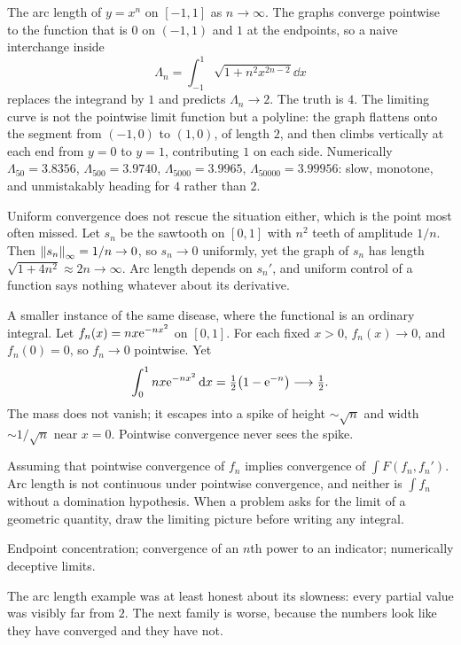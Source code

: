 \begin{worked}
The arc length of $y=x^{n}$ on $[-1,1]$ as $n\to\infty$. The graphs converge pointwise to the function that is $0$ on $(-1,1)$ and $1$ at the endpoints, so a naive interchange inside
\[\Lambda_n=\int_{-1}^{1}\sqrt{1+n^{2}x^{2n-2}}\dd x\]
replaces the integrand by $1$ and predicts $\Lambda_n\to2$. The truth is $4$. The limiting curve is not the pointwise limit function but a polyline: the graph flattens onto the segment from $(-1,0)$ to $(1,0)$, of length $2$, and then climbs vertically at each end from $y=0$ to $y=1$, contributing $1$ on each side. Numerically $\Lambda_{50}=3.8356$, $\Lambda_{500}=3.9740$, $\Lambda_{5000}=3.9965$, $\Lambda_{50000}=3.99956$: slow, monotone, and unmistakably heading for $4$ rather than $2$.

Uniform convergence does not rescue the situation either, which is the point most often missed. Let $s_n$ be the sawtooth on $[0,1]$ with $n^{2}$ teeth of amplitude $1/n$. Then $\left\lVert s_n\right\rVert_{\infty}=1/n\to0$, so $s_n\to0$ uniformly, yet the graph of $s_n$ has length $\sqrt{1+4n^{2}}\approx2n\to\infty$. Arc length depends on $s_n'$, and uniform control of a function says nothing whatever about its derivative.

A smaller instance of the same disease, where the functional is an ordinary integral. Let $f_n(x)=nx\mathrm{e}^{-nx^{2}}$ on $[0,1]$. For each fixed $x>0$, $f_n(x)\to0$, and $f_n(0)=0$, so $f_n\to0$ pointwise. Yet
\[\int_0^1 nx\mathrm{e}^{-nx^{2}}\,\mathrm{d} x=\tfrac12\bigl(1-\mathrm{e}^{-n}\bigr)\longrightarrow\tfrac12 .\]
The mass does not vanish; it escapes into a spike of height $\sim\sqrt{n}$ and width $\sim1/\sqrt n$ near $x=0$. Pointwise convergence never sees the spike.
\end{worked}

\begin{trap}
Assuming that pointwise convergence of $f_n$ implies convergence of $\int F(f_n,f_n')$. Arc length is not continuous under pointwise convergence, and neither is $\int f_n$ without a domination hypothesis. When a problem asks for the limit of a geometric quantity, draw the limiting picture before writing any integral.
\end{trap}

\begin{seealsob}Endpoint concentration; convergence of an $n$th power to an indicator; numerically deceptive limits.\end{seealsob}

The arc length example was at least honest about its slowness: every partial value was visibly far from $2$. The next family is worse, because the numbers look like they have converged and they have not.

